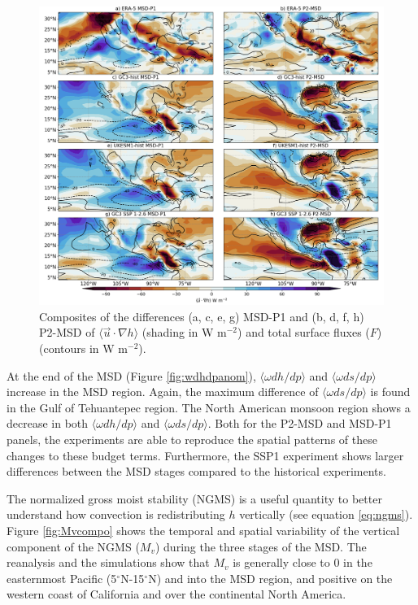 \begin{figure}[t!]
\includegraphics[width=\linewidth]{figures/thermocompositeint_udothanom.png}
\caption[Composites of the anomalous horizontal advection of MSE and surface fluxes]{Composites of the differences (a, c, e, g) MSD-P1 and (b, d, f, h) P2-MSD of $\langle \vec{u}\cdot\nabla h \rangle$ (shading in W m$^{-2}$) and total surface fluxes ($F$) (contours in W m$^{-2}$).  }
\label{fig:intudothanom}
\end{figure} 
  
 
 At the end of the MSD (Figure \ref{fig:wdhdpanom}), $\langle \omega dh/dp \rangle$ and $\langle \omega ds/dp \rangle$ increase in the MSD region. Again, the maximum difference of $\langle \omega ds/dp \rangle$ is found in the Gulf of Tehuantepec region. The North American monsoon region shows a decrease in both $\langle \omega dh/dp \rangle$ and $\langle \omega ds/dp \rangle$. 
 Both for the P2-MSD and MSD-P1 panels, the experiments are able to reproduce the spatial patterns of these changes to these budget terms. Furthermore, the SSP1 experiment shows larger differences between the MSD stages compared to the historical experiments.

The normalized gross moist stability (NGMS) is a useful quantity to better understand how convection is redistributing $h$ vertically (see equation \ref{eq:ngms}). Figure \ref{fig:Mvcompo} shows the temporal and spatial variability of the vertical component of the NGMS ($M_v$) during the three stages of the MSD. The reanalysis and the simulations show that $M_v$ is generally close to 0 in the easternmost Pacific (5$^\circ$N-15$^\circ$N) and into the MSD region, and positive on the western coast of California and over the continental North America.

